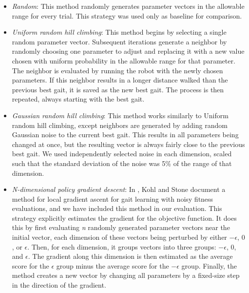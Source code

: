 \begin{itemize}

\item \emph{Random}: This method randomly generates parameter vectors
  in the allowable range for every trial. This strategy was used only as baseline for comparison.

\item \emph{Uniform random hill climbing}: This method begins by
  selecting a single random parameter vector.  Subsequent iterations
  generate a neighbor by randomly choosing one parameter to adjust and
  replacing it with a new value chosen with uniform probability in the
  allowable range for that parameter. The neighbor is evaluated by
  running the robot with the newly chosen parameters. If this neighbor
  results in a longer distance walked than the previous best gait, it
  is saved as the new best gait. The process is then repeated, always
  starting with the best gait.

\item \emph{Gaussian random hill climbing}: This method works
  similarly to Uniform random hill climbing, except neighbors are
  generated by adding random Gaussian noise to the current best gait.
  This results in all parameters being changed at once, but the
  resulting vector is always fairly close to the previous best gait.
  We used independently selected noise in each dimension, scaled such
  that the standard deviation of the noise was 5\% of the range of
  that dimension.

\item \emph{N-dimensional policy gradient descent}: In \cite{kohl},
  Kohl and Stone document a method for local gradient ascent for gait
  learning with noisy fitness evaluations, and we have included this
  method in our evaluation.  This strategy explicitly estimates the
  gradient for the objective function. It does this by first
  evaluating \emph{n} randomly generated parameter vectors near the
  initial vector, each dimension of these vectors being perturbed by
  either $-\epsilon$, $0$, or $\epsilon$. Then, for each dimension, it
  groups vectors into three groups: $-\epsilon$, $0$, and $\epsilon$.
  The gradient along this dimension is then estimated as the average
  score for the $\epsilon$ group minus the average score for the
  $-\epsilon$ group. Finally, the method creates a new vector by
  changing all parameters by a fixed-size step in the direction of the
  gradient.


\end{itemize}
